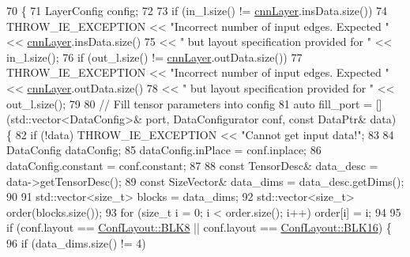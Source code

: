 \begin{DoxyCode}
70                                                                                                            
                 \{
71     LayerConfig config;
72 
73     \textcolor{keywordflow}{if} (in\_l.size() != \hyperlink{classInferenceEngine_1_1Extensions_1_1Cpu_1_1ExtLayerBase_a1074cdccacb9e9ca6eec01bbc2f7ca4a}{cnnLayer}.insData.size())
74         THROW\_IE\_EXCEPTION << \textcolor{stringliteral}{"Incorrect number of input edges. Expected "} << 
      \hyperlink{classInferenceEngine_1_1Extensions_1_1Cpu_1_1ExtLayerBase_a1074cdccacb9e9ca6eec01bbc2f7ca4a}{cnnLayer}.insData.size()
75                            << \textcolor{stringliteral}{" but layout specification provided for "} << in\_l.size();
76     \textcolor{keywordflow}{if} (out\_l.size() != \hyperlink{classInferenceEngine_1_1Extensions_1_1Cpu_1_1ExtLayerBase_a1074cdccacb9e9ca6eec01bbc2f7ca4a}{cnnLayer}.outData.size())
77         THROW\_IE\_EXCEPTION << \textcolor{stringliteral}{"Incorrect number of input edges. Expected "} << 
      \hyperlink{classInferenceEngine_1_1Extensions_1_1Cpu_1_1ExtLayerBase_a1074cdccacb9e9ca6eec01bbc2f7ca4a}{cnnLayer}.outData.size()
78                            << \textcolor{stringliteral}{" but layout specification provided for "} << out\_l.size();
79 
80     \textcolor{comment}{// Fill tensor parameters into config}
81     \textcolor{keyword}{auto} fill\_port = [] (std::vector<DataConfig>& port, DataConfigurator conf, \textcolor{keyword}{const} DataPtr& data) \{
82         \textcolor{keywordflow}{if} (!data) THROW\_IE\_EXCEPTION << \textcolor{stringliteral}{"Cannot get input data!"};
83 
84         DataConfig dataConfig;
85         dataConfig.inPlace = conf.inplace;
86         dataConfig.constant = conf.constant;
87 
88         \textcolor{keyword}{const} TensorDesc& data\_desc = data->getTensorDesc();
89         \textcolor{keyword}{const} SizeVector& data\_dims = data\_desc.getDims();
90 
91         std::vector<size\_t> blocks = data\_dims;
92         std::vector<size\_t> order(blocks.size());
93         \textcolor{keywordflow}{for} (\textcolor{keywordtype}{size\_t} i = 0; i < order.size(); i++) order[i] = i;
94 
95         \textcolor{keywordflow}{if} (conf.layout == \hyperlink{classInferenceEngine_1_1Extensions_1_1Cpu_1_1ExtLayerBase_a1258a8d209e0249e0b1717618352ddfba6023b7e0a175b8cf9cbcec3ac3cbf93d}{ConfLayout::BLK8} || conf.layout == 
      \hyperlink{classInferenceEngine_1_1Extensions_1_1Cpu_1_1ExtLayerBase_a1258a8d209e0249e0b1717618352ddfba733623e98c6602d47f51e9f7be2f7d6c}{ConfLayout::BLK16}) \{
96             \textcolor{keywordflow}{if} (data\_dims.size() != 4)

\end{DoxyCode}
